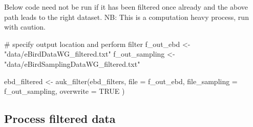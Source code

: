 \documentclass[]{article}
\newenvironment{Shaded}{}{}
\newcommand{\CommentTok}[1]{\textcolor[rgb]{0.00,0.50,0.00}{#1}}
\newcommand{\DataTypeTok}[1]{#1}
\newcommand{\KeywordTok}[1]{\textcolor[rgb]{0.00,0.00,1.00}{#1}}
\newcommand{\NormalTok}[1]{#1}
\newcommand{\OperatorTok}[1]{#1}
\newcommand{\OtherTok}[1]{\textcolor[rgb]{1.00,0.25,0.00}{#1}}
\newcommand{\StringTok}[1]{\textcolor[rgb]{0.00,0.50,0.50}{#1}}
\begin{document}
\begin{Shaded}
\end{Shaded}

Below code need not be run if it has been filtered once already and the above path leads to the right dataset. NB: This is a computation heavy process, run with caution.

\begin{Shaded}
\begin{Highlighting}[]

\CommentTok{# specify output location and perform filter}
\NormalTok{f_out_ebd <-}\StringTok{ "data/eBirdDataWG_filtered.txt"}
\NormalTok{f_out_sampling <-}\StringTok{ "data/eBirdSamplingDataWG_filtered.txt"}
\end{Highlighting}
\end{Shaded}

\begin{Shaded}
\begin{Highlighting}[]
\NormalTok{ebd_filtered <-}\StringTok{ }\KeywordTok{auk_filter}\NormalTok{(ebd_filters,}
  \DataTypeTok{file =}\NormalTok{ f_out_ebd,}
  \DataTypeTok{file_sampling =}\NormalTok{ f_out_sampling, }\DataTypeTok{overwrite =} \OtherTok{TRUE}
\NormalTok{)}
\end{Highlighting}
\end{Shaded}

\hypertarget{process-filtered-data}{%
\subsection{Process filtered data}\label{process-filtered-data}}
\end{document}
